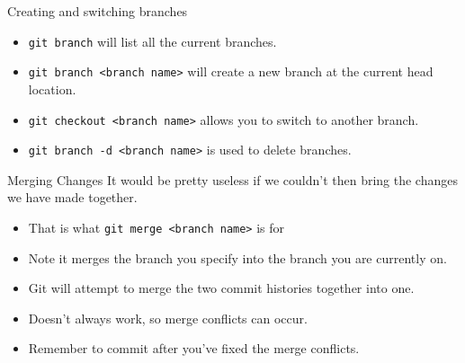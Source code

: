 \documentclass{beamer}
\begin{document}
\begin{frame}{Creating and switching branches}
    \begin{itemize}
        \item \texttt{git branch} will list all the current branches.
        \item \texttt{git branch <branch name>} will create a new branch at the current head location.
        \item \texttt{git checkout <branch name>} allows you to switch to another branch.
        \item \texttt{git branch -d <branch name>} is used to delete branches.
    \end{itemize}
\end{frame}

\begin{frame}{Merging Changes}
It would be pretty useless if we couldn't then bring the changes we have made together.
\begin{itemize}
    \item That is what \texttt{git merge <branch name>} is for
    \item Note it merges the branch you specify into the branch you are currently on.
    \item Git will attempt to merge the two commit histories together into one.
    \item Doesn't always work, so merge conflicts can occur. 
    \item Remember to commit after you've fixed the merge conflicts.
\end{itemize}
\end{frame}
\end{document}
